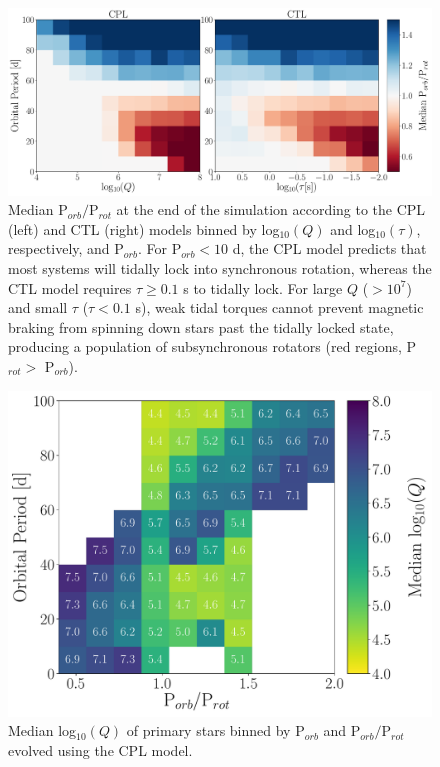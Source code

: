 \begin{figure}
	\includegraphics[width=\columnwidth]{qTauPorbRatioHist.pdf}
   \caption{Median P$_{orb}/$P$_{rot}$ at the end of the simulation according to the CPL (left) and CTL (right) models binned by log$_{10}(Q)$ and log$_{10}(\tau)$, respectively, and P$_{orb}$.  For P$_{orb} < 10$ d, the CPL model predicts that most systems will tidally lock into synchronous rotation, whereas the CTL model requires $\tau \geq 0.1$ s to tidally lock.  For large $Q$ ($> 10^7$) and small $\tau$ ($\tau < 0.1$ s), weak tidal torques cannot prevent magnetic braking from spinning down stars past the tidally locked state, producing a population of subsynchronous rotators (red regions, P$_{rot} >$ P$_{orb}$).}%
    \label{sync:fig:qTauLock}%
\end{figure}


\begin{figure}
	\includegraphics[width=\columnwidth]{porbProtPorbQHist.pdf}
   \caption{Median log$_{10}(Q)$ of primary stars binned by P$_{orb}$ and P$_{orb}/$P$_{rot}$ evolved using the CPL model. }%
    \label{sync:fig:qmap}%
\end{figure}

